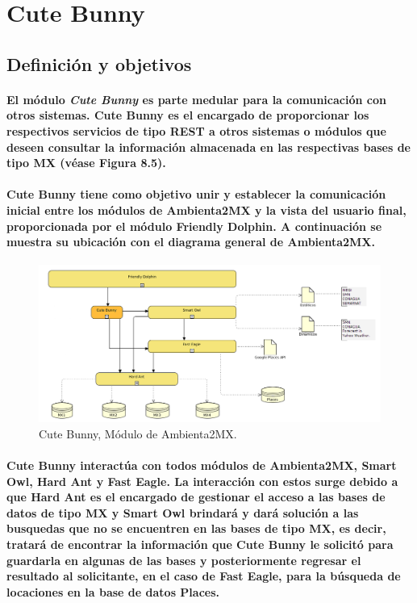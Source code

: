 \section{Cute Bunny}
  \subsection{Definición y objetivos}
    \paragraph{El módulo \textbf{\emph{Cute Bunny}} es parte medular para la comunicación con otros sistemas. Cute Bunny es el encargado de proporcionar los respectivos servicios de tipo REST a otros sistemas o módulos que deseen consultar la información almacenada en las respectivas bases de tipo MX (véase Figura 8.5).}
    \paragraph{Cute Bunny tiene como objetivo unir y establecer la comunicación inicial entre los módulos de Ambienta2MX y la vista del usuario final, proporcionada por el módulo Friendly Dolphin. A continuación se muestra su ubicación con el diagrama general de Ambienta2MX.}
    \begin{figure}[h!]
        \centering
          \includegraphics[width=\textwidth]{./images/DiagramaAmbienta2MX_CuteBunny.png}
        \caption{Cute Bunny, Módulo de Ambienta2MX.}
    \end{figure}
    \paragraph{Cute Bunny interactúa con todos módulos de Ambienta2MX, Smart Owl, Hard Ant y Fast Eagle. La interacción con estos surge debido a que Hard Ant es el encargado de gestionar el acceso a las bases de datos de tipo MX y Smart Owl brindará y dará solución a las busquedas que no se encuentren en las bases de tipo MX, es decir, tratará de encontrar la información que Cute Bunny le solicitó para guardarla en algunas de las bases y posteriormente regresar el resultado al solicitante, en el caso de Fast Eagle, para la búsqueda de locaciones en la base de datos Places.}
